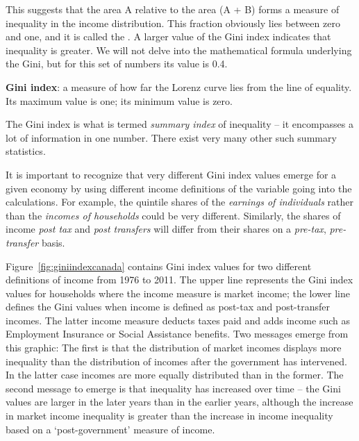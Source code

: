 This suggests that the area A relative to the area (A + B) forms a measure
of inequality in the income distribution. This fraction obviously lies
between zero and one, and it is called the . A
larger value of the Gini index indicates that inequality is greater. We will
not delve into the mathematical formula underlying the Gini, but for this
set of numbers its value is 0.4.

\begin{DefBox}
	\textbf{Gini index}: a measure of how far the Lorenz curve lies from the line of equality. Its maximum value is one; its minimum value is zero.
\end{DefBox}

The Gini index is what is termed \textit{summary index} of inequality -- it
encompasses a lot of information in one number. There exist very many other
such summary statistics.

It is important to recognize that very different Gini index values emerge
for a given economy by using different income definitions of the variable
going into the calculations. For example, the quintile shares of the 
\textit{earnings of individuals} rather than the \textit{incomes of households}
could be very different. Similarly, the shares of income \textit{post tax}
and \textit{post transfers} will differ from their shares on a \textit{pre-tax}, 
\textit{pre-transfer} basis.

\newhtmlpage



Figure~\ref{fig:giniindexcanada} contains Gini index values for two
different definitions of income from 1976 to 2011. The upper line
represents the Gini index values for households where the income measure is
market income; the lower line defines the Gini values when income is defined
as post-tax and post-transfer incomes. The latter income measure deducts
taxes paid and adds income such as Employment Insurance or Social Assistance
benefits. Two messages emerge from this graphic: The first is that the
distribution of market incomes displays more inequality than the
distribution of incomes after the government has intervened. In the latter
case incomes are more equally distributed than in the former. The second
message to emerge is that inequality has increased over time -- the Gini
values are larger in the later years than in the earlier years, although the
increase in market income inequality is greater than the increase in income
inequality based on a `post-government' measure of income.

